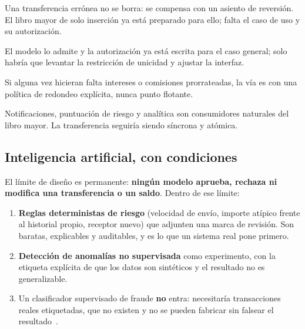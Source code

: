 \begin{description}[leftmargin=0.6cm,style=nextline]
  \item[Reversiones contables.] Una transferencia errónea no se borra: se
    compensa con un asiento de reversión. El libro mayor de solo inserción ya
    está preparado para ello; falta el caso de uso y su autorización.
  \item[Varias cuentas por usuario.] El modelo lo admite y la autorización ya
    está escrita para el caso general; solo habría que levantar la
    restricción de unicidad y ajustar la interfaz.
  \item[Fracciones de céntimo.] Si alguna vez hicieran falta intereses o
    comisiones prorrateadas, la vía es  con una política de
    redondeo explícita, nunca punto flotante.
  \item[Arquitectura orientada a eventos para lo posterior.] Notificaciones,
    puntuación de riesgo y analítica son consumidores naturales del libro
    mayor. La transferencia seguiría siendo síncrona y atómica.
\end{description}

\subsection{Inteligencia artificial, con condiciones}

El límite de diseño es permanente: \textbf{ningún modelo aprueba, rechaza ni
modifica una transferencia o un saldo}. Dentro de ese límite:

\begin{enumerate}[leftmargin=1.4em]
  \item \textbf{Reglas deterministas de riesgo} (velocidad de envío, importe
    atípico frente al historial propio, receptor nuevo) que adjunten una marca
    de revisión. Son baratas, explicables y auditables, y es lo que un sistema
    real pone primero.
  \item \textbf{Detección de anomalías no supervisada} como experimento, con
    la etiqueta explícita de que los datos son sintéticos y el resultado no es
    generalizable.
  \item Un clasificador supervisado de fraude \textbf{no} entra: necesitaría
    transacciones reales etiquetadas, que no existen y no se pueden fabricar
    sin falsear el resultado~\cite{sculley2015}.
\end{enumerate}
